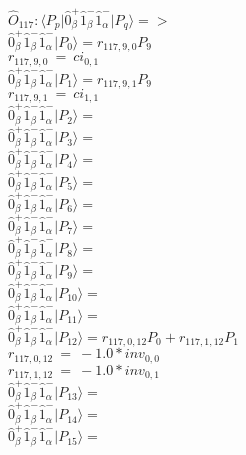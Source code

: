 \documentclass[14pt]{article}
\begin{document}
    $\hat{O}_{117}:  \langle{P_p}\vert \hat{0}_{\beta}^{+}\hat{1}_{\beta}^{-}\hat{1}_{\alpha}^{-} \vert{P_q}\rangle => $ \\ 
    $ \hat{0}_{\beta}^{+}\hat{1}_{\beta}^{-}\hat{1}_{\alpha}^{-} \vert{P_{0}}\rangle = {r}_{117,9,0}P_{9} $ \\ 
    ${r}_{117,9,0}\ =\ {ci}_{0,1} $ \\ 
    $ \hat{0}_{\beta}^{+}\hat{1}_{\beta}^{-}\hat{1}_{\alpha}^{-} \vert{P_{1}}\rangle = {r}_{117,9,1}P_{9} $ \\ 
    ${r}_{117,9,1}\ =\ {ci}_{1,1} $ \\ 
    $ \hat{0}_{\beta}^{+}\hat{1}_{\beta}^{-}\hat{1}_{\alpha}^{-} \vert{P_{2}}\rangle =  $ \\ 
    $ \hat{0}_{\beta}^{+}\hat{1}_{\beta}^{-}\hat{1}_{\alpha}^{-} \vert{P_{3}}\rangle =  $ \\ 
    $ \hat{0}_{\beta}^{+}\hat{1}_{\beta}^{-}\hat{1}_{\alpha}^{-} \vert{P_{4}}\rangle =  $ \\ 
    $ \hat{0}_{\beta}^{+}\hat{1}_{\beta}^{-}\hat{1}_{\alpha}^{-} \vert{P_{5}}\rangle =  $ \\ 
    $ \hat{0}_{\beta}^{+}\hat{1}_{\beta}^{-}\hat{1}_{\alpha}^{-} \vert{P_{6}}\rangle =  $ \\ 
    $ \hat{0}_{\beta}^{+}\hat{1}_{\beta}^{-}\hat{1}_{\alpha}^{-} \vert{P_{7}}\rangle =  $ \\ 
    $ \hat{0}_{\beta}^{+}\hat{1}_{\beta}^{-}\hat{1}_{\alpha}^{-} \vert{P_{8}}\rangle =  $ \\ 
    $ \hat{0}_{\beta}^{+}\hat{1}_{\beta}^{-}\hat{1}_{\alpha}^{-} \vert{P_{9}}\rangle =  $ \\ 
    $ \hat{0}_{\beta}^{+}\hat{1}_{\beta}^{-}\hat{1}_{\alpha}^{-} \vert{P_{10}}\rangle =  $ \\ 
    $ \hat{0}_{\beta}^{+}\hat{1}_{\beta}^{-}\hat{1}_{\alpha}^{-} \vert{P_{11}}\rangle =  $ \\ 
    $ \hat{0}_{\beta}^{+}\hat{1}_{\beta}^{-}\hat{1}_{\alpha}^{-} \vert{P_{12}}\rangle = {r}_{117,0,12}P_{0}+{r}_{117,1,12}P_{1} $ \\ 
    ${r}_{117,0,12}\ =\ -1.0*{inv}_{0,0} $ \\ 
    ${r}_{117,1,12}\ =\ -1.0*{inv}_{0,1} $ \\ 
    $ \hat{0}_{\beta}^{+}\hat{1}_{\beta}^{-}\hat{1}_{\alpha}^{-} \vert{P_{13}}\rangle =  $ \\ 
    $ \hat{0}_{\beta}^{+}\hat{1}_{\beta}^{-}\hat{1}_{\alpha}^{-} \vert{P_{14}}\rangle =  $ \\ 
    $ \hat{0}_{\beta}^{+}\hat{1}_{\beta}^{-}\hat{1}_{\alpha}^{-} \vert{P_{15}}\rangle =  $ \\ 
    
\end{document}
